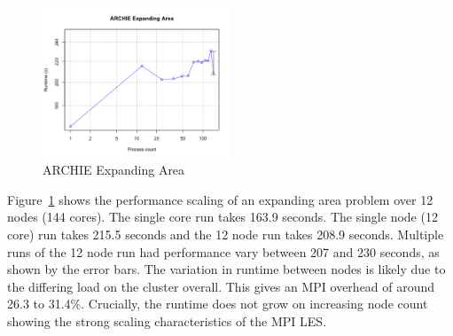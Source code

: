 \begin{figure}
    \includegraphics[width=0.5\textwidth]{graphs/ARCHIE-expanding-area.png}
    \caption{ARCHIE Expanding Area}
    \label{fig:archieexpandingarea}
\end{figure}

Figure~\ref{fig:archieexpandingarea} shows the performance scaling of an
expanding area problem over 12 nodes (144 cores). The single core run takes
163.9 seconds. The single node (12 core) run takes 215.5 seconds and the 12 node
run takes 208.9 seconds. Multiple runs of the 12 node run had performance vary
between 207 and 230 seconds, as shown by the error bars. The variation in
runtime between nodes is likely due to the differing load on the cluster
overall. This gives an MPI overhead of around 26.3 to 31.4\%. Crucially, the
runtime does not grow on increasing node count showing the strong scaling
characteristics of the MPI LES.
